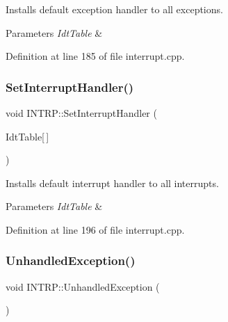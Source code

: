 Installs default exception handler to all exceptions. 


\begin{DoxyParams}{Parameters}
{\em Idt\+Table} & \\
\hline
\end{DoxyParams}


Definition at line 185 of file interrupt.\+cpp.

\mbox{\label{namespace_i_n_t_r_p_abf09ee877603981fe255cd050cbbb110}} 
\subsubsection{\texorpdfstring{Set\+Interrupt\+Handler()}{SetInterruptHandler()}}
{\footnotesize\ttfamily void I\+N\+T\+R\+P\+::\+Set\+Interrupt\+Handler (\begin{DoxyParamCaption}\item[{\hyperlink{union_i_n_t_r_p_1_1_descriptor_entry}{Descriptor\+Entry}}]{Idt\+Table\mbox{[}$\,$\mbox{]} }\end{DoxyParamCaption})}



Installs default interrupt handler to all interrupts. 


\begin{DoxyParams}{Parameters}
{\em Idt\+Table} & \\
\hline
\end{DoxyParams}


Definition at line 196 of file interrupt.\+cpp.

\mbox{\label{namespace_i_n_t_r_p_a7732859732913734b09dd07030c41991}} 
\subsubsection{\texorpdfstring{Unhandled\+Exception()}{UnhandledException()}}
{\footnotesize\ttfamily void I\+N\+T\+R\+P\+::\+Unhandled\+Exception (\begin{DoxyParamCaption}{ }\end{DoxyParamCaption})}



